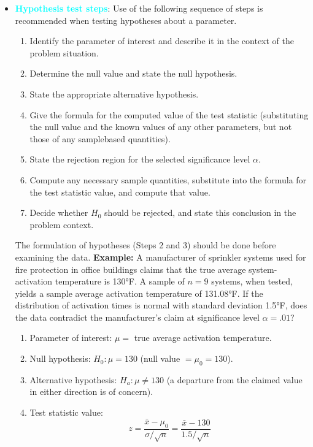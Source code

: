 \documentclass{report}
\begin{document}
\begin{itemize}
    \bigbreak \noindent 
\item \textbf{\textcolor{cyan}{Hypothesis test steps}}: Use of the following sequence of steps is recommended when testing hypotheses about a parameter.
    \begin{enumerate}
        \item Identify the parameter of interest and describe it in the context of the problem situation.
        \item Determine the null value and state the null hypothesis.
        \item State the appropriate alternative hypothesis.
        \item Give the formula for the computed value of the test statistic (substituting the null value and the known values of any other parameters, but not those of any samplebased quantities).
        \item State the rejection region for the selected significance level $\alpha$.
        \item Compute any necessary sample quantities, substitute into the formula for the test statistic value, and compute that value.
        \item Decide whether $H_{0}$ should be rejected, and state this conclusion in the problem context.
    \end{enumerate}
    The formulation of hypotheses (Steps 2 and 3) should be done before examining the data.
    \bigbreak \noindent 
    \textbf{Example:} 
    A manufacturer of sprinkler systems used for fire protection in office buildings claims that the true average system-activation temperature is 130°F. A sample of \( n = 9 \) systems, when tested, yields a sample average activation temperature of 131.08°F. If the distribution of activation times is normal with standard deviation 1.5°F, does the data contradict the manufacturer's claim at significance level \( \alpha = .01 \)?
    \begin{enumerate}
        \item Parameter of interest: \( \mu = \) true average activation temperature.
        \item Null hypothesis: \( H_0: \mu = 130 \) (null value \( = \mu_0 = 130 \)).
        \item Alternative hypothesis: \( H_a: \mu \neq 130 \) (a departure from the claimed value in either direction is of concern).
        \item Test statistic value:
            \[
                z = \frac{\bar{x} - \mu_0}{\sigma / \sqrt{n}} = \frac{\bar{x} - 130}{1.5 / \sqrt{n}}
\]
\end{enumerate}
\end{itemize}
\end{document}
